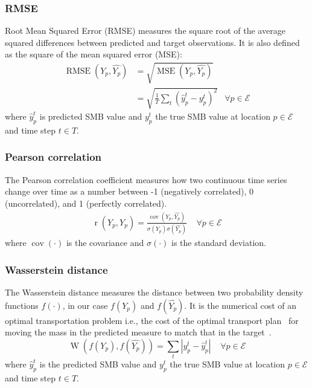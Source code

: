 \documentclass[a4paper,11pt,oneside]{report}
\begin{document}
\subsubsection{RMSE}\label{subsubsec:rmse}
Root Mean Squared Error (RMSE) measures the square root of the average squared differences between predicted and target observations. It is also defined as the square of the mean squared error (MSE):
\begin{align}\label{eq:RMSE}
        \operatorname{RMSE}\left(Y_{p},\widehat{Y_{p}}\right) & = \sqrt{\operatorname{MSE}\left(Y_{p},\widehat{Y_{p}}\right)} \\ & = \sqrt{\frac{1}{T}\sum_{t}(\hat{y}_{p}^{t}-y^{t}_{p})^2} & \forall p \in \mathcal{E} 
\end{align}
where $\hat{y}_{p}^{t}$ is predicted SMB value and $y^{t}_{p}$ the true SMB value at location $p\in \mathcal{E} $ and time step $t\in T$. 

\subsubsection{Pearson correlation}\label{subsubsec:pearson-corr}
The Pearson correlation coefficient measures how two continuous time series change over time as a number between -1 (negatively correlated), 0 (uncorrelated), and 1 (perfectly correlated).
\begin{align}
    \operatorname{r}\left(Y_{p},\widehat{Y_{p}}\right) = \frac{\operatorname{cov}(Y_{p},\widehat{Y_{p}})}{\sigma(Y_{p})\sigma(\widehat{Y_{p}})} \;\;\;\; \forall p \in \mathcal{E} 
\end{align}
where $\operatorname {cov}(\cdot)$  is the covariance and  $\sigma(\cdot)$ is the standard deviation.

\subsubsection{Wasserstein distance}\label{subsubsec:wasserstein}
The Wasserstein distance measures the distance between two probability density functions $f(\cdotp)$, in our case $f(Y_p)$ and $f(\widehat{Y_p})$. It is the numerical cost of an optimal transportation problem i.e., the cost of the optimal transport plan~\cite{villani} for moving the mass in the predicted
measure to match that in the target~\cite{wasserstein1}. 
\begin{equation}
    \operatorname{W}\left(f(Y_p),f(\widehat{Y_p})\right) = \sum_{t}|y^{t}_{p}-\hat{y}_{p}^{t}| \;\;\;\; \forall p \in \mathcal{E}
\end{equation}
where $\hat{y}_{p}^{t}$ is the predicted SMB value and $y^{t}_{p}$ the true SMB value at location $p\in \mathcal{E} $ and time step $t\in T$. 
\end{document}
